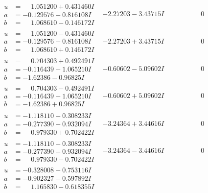 \documentclass[1p]{elsarticle_modified}
\theoremstyle{definition}
\begin{document}
$$\begin{array}{c|c|c}
 \hline 
\begin{aligned}
u &= \phantom{-}1.051200 + 0.431460 I \\
a &= -0.129576 - 0.816108 I \\
b &= \phantom{-}1.068610 - 0.146172 I\end{aligned}
 & -2.27203 - 3.43715 I & \phantom{-0.000000 } 0 \\ \hline\begin{aligned}
u &= \phantom{-}1.051200 - 0.431460 I \\
a &= -0.129576 + 0.816108 I \\
b &= \phantom{-}1.068610 + 0.146172 I\end{aligned}
 & -2.27203 + 3.43715 I & \phantom{-0.000000 } 0 \\ \hline\begin{aligned}
u &= \phantom{-}0.704303 + 0.492491 I \\
a &= -0.116439 + 1.065210 I \\
b &= -1.62386 - 0.96825 I\end{aligned}
 & -0.60602 - 5.09602 I & \phantom{-0.000000 } 0 \\ \hline\begin{aligned}
u &= \phantom{-}0.704303 - 0.492491 I \\
a &= -0.116439 - 1.065210 I \\
b &= -1.62386 + 0.96825 I\end{aligned}
 & -0.60602 + 5.09602 I & \phantom{-0.000000 } 0 \\ \hline\begin{aligned}
u &= -1.118110 + 0.308233 I \\
a &= -0.277390 + 0.932094 I \\
b &= \phantom{-}0.979330 + 0.702422 I\end{aligned}
 & -3.24364 + 3.44616 I & \phantom{-0.000000 } 0 \\ \hline\begin{aligned}
u &= -1.118110 - 0.308233 I \\
a &= -0.277390 - 0.932094 I \\
b &= \phantom{-}0.979330 - 0.702422 I\end{aligned}
 & -3.24364 - 3.44616 I & \phantom{-0.000000 } 0 \\ \hline\begin{aligned}
u &= -0.328008 + 0.753116 I \\
a &= -0.902327 + 0.597892 I \\
b &= \phantom{-}1.165830 - 0.618355 I\end{aligned}

\end{array}$$
\end{document}

